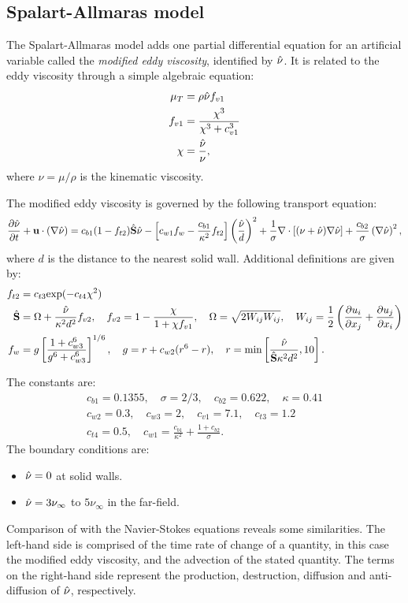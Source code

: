 \subsection{Spalart-Allmaras model}
\label{sec:sa}
The Spalart-Allmaras model adds one partial differential equation for an artificial variable called the \textit{modified eddy viscosity}, identified by $\sa$. It is related to the eddy viscosity through a simple algebraic equation:
\begin{align*}
    \mu_T &= \rho \sa f_{v1}\\
    f_{v1} &= \frac{\chi^3}{\chi^3 + c_{v1}^3}\\
    \chi &= \frac{\sa}{\nu},
\end{align*}
where $\nu = \mu/\rho$ is the kinematic viscosity.

The modified eddy viscosity is governed by the following transport equation:
\begin{equation}
    \pdiff{\sa}{t} + \vec{u}\cdot(\nabla\sa) =
        c_{b1}(1 - f_{t2})\hat{S}\sa
        - \left[
            c_{w1}f_w - \frac{c_{b1}}{\kappa^2}f_{t2}
        \right] \left(
            \frac{\sa}{d}
        \right)^2
        + \frac{1}{\sigma}\nabla\cdot\left[ (\nu + \sa) \nabla\sa \right]
        + \frac{c_{b2}}{\sigma}\left(\nabla \sa\right)^2
        \label{eq:sa},
\end{equation}
where $d$ is the distance to the nearest solid wall. Additional definitions are given by:
\begin{align*}
    f_{t2} &= c_{t3} \text{exp}(-c_{t4}\chi^2)\\
    \hat{S} &= \Omega + \frac{\sa}{\kappa^2 d^2}f_{v2}, \quad
        f_{v2} = 1 - \frac{\chi}{1 + \chi f_{v1}}, \quad
        \Omega = \sqrt{2W_{ij}W_{ij}}, \quad
        W_{ij} = \frac{1}{2}\left(\pdiff{u_i}{x_j} + \pdiff{u_j}{x_i}\right)\\
    f_{w} &= g \left[
        \frac{1 + c_{w3}^6}{g^6 + c_{w3}^6}
    \right]^{1/6}, \quad
        g = r + c_{w2}(r^6 - r), \quad
        r = \text{min}\left[ \frac{\sa}{\hat{S}\kappa^2d^2}, 10 \right].
\end{align*}

The constants are:
\begin{gather*}
    c_{b1} = 0.1355, \quad \sigma = 2/3, \quad c_{b2} = 0.622, \quad \kappa = 0.41\\
    c_{w2} = 0.3, \quad c_{w3} = 2, \quad c_{v1} = 7.1, \quad c_{t3} = 1.2\\
    c_{t4} = 0.5, \quad c_{w1} = \frac{c_{b1}}{\kappa^2} + \frac{1 + c_{b2}}{\sigma}.
\end{gather*}
The boundary conditions are:
\begin{itemize}
    \item $\sa = 0$ at solid walls.
    \item $\sa = 3\nu_\infty$ to $5\nu_\infty$ in the far-field.
\end{itemize}
Comparison of  with the Navier-Stokes equations reveals some similarities. The left-hand side is comprised of the time rate of change of a quantity, in this case the modified eddy viscosity, and the advection of the stated quantity. The terms on the right-hand side represent the production, destruction, diffusion and anti-diffusion of $\sa$, respectively.

